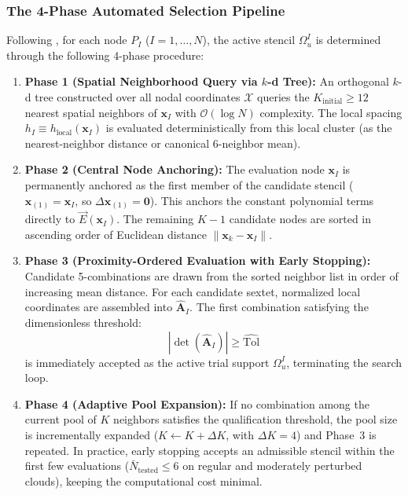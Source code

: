 \documentclass[preprint,12pt]{elsarticle}
\begin{document}
\subsubsection{The 4-Phase Automated Selection Pipeline}
Following \cite{stable_vnmm2d_2026}, for each node $P_I$ ($I = 1, \dots, N$), the active stencil $\Omega_u^I$ is determined through the following 4-phase procedure:
\begin{enumerate}
    \item \textbf{Phase 1 (Spatial Neighborhood Query via $k$-d Tree):} An orthogonal $k$-d tree constructed over all nodal coordinates $\mathcal{X}$ queries the $K_{\mathrm{initial}} \ge 12$ nearest spatial neighbors of $\mathbf{x}_I$ with $\mathcal{O}(\log N)$ complexity. The local spacing $h_I \equiv h_{\mathrm{local}}(\mathbf{x}_I)$ is evaluated deterministically from this local cluster (as the nearest-neighbor distance or canonical 6-neighbor mean).
    \item \textbf{Phase 2 (Central Node Anchoring):} The evaluation node $\mathbf{x}_I$ is permanently anchored as the first member of the candidate stencil ($\mathbf{x}_{(1)} = \mathbf{x}_I$, so $\Delta\mathbf{x}_{(1)} = \mathbf{0}$). This anchors the constant polynomial terms directly to $\vec{E}(\mathbf{x}_I)$. The remaining $K-1$ candidate nodes are sorted in ascending order of Euclidean distance $\|\mathbf{x}_k - \mathbf{x}_I\|$.
    \item \textbf{Phase 3 (Proximity-Ordered Evaluation with Early Stopping):} Candidate 5-combinations are drawn from the sorted neighbor list in order of increasing mean distance. For each candidate sextet, normalized local coordinates are assembled into $\widehat{\mathbf{A}}_I$. The first combination satisfying the dimensionless threshold:
          \begin{equation}
              |\det(\widehat{\mathbf{A}}_I)| \ge \widehat{\mathrm{Tol}}
          \end{equation}
          is immediately accepted as the active trial support $\Omega_u^I$, terminating the search loop.
    \item \textbf{Phase 4 (Adaptive Pool Expansion):} If no combination among the current pool of $K$ neighbors satisfies the qualification threshold, the pool size is incrementally expanded ($K \leftarrow K + \Delta K$, with $\Delta K = 4$) and Phase~3 is repeated. In practice, early stopping accepts an admissible stencil within the first few evaluations ($\bar{N}_{\mathrm{tested}} \le 6$ on regular and moderately perturbed clouds), keeping the computational cost minimal.
\end{enumerate}
\end{document}
